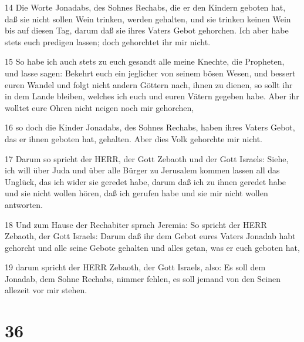 \par 14 Die Worte Jonadabs, des Sohnes Rechabs, die er den Kindern geboten hat, daß sie nicht sollen Wein trinken, werden gehalten, und sie trinken keinen Wein bis auf diesen Tag, darum daß sie ihres Vaters Gebot gehorchen. Ich aber habe stets euch predigen lassen; doch gehorchtet ihr mir nicht.
\par 15 So habe ich auch stets zu euch gesandt alle meine Knechte, die Propheten, und lasse sagen: Bekehrt euch ein jeglicher von seinem bösen Wesen, und bessert euren Wandel und folgt nicht andern Göttern nach, ihnen zu dienen, so sollt ihr in dem Lande bleiben, welches ich euch und euren Vätern gegeben habe. Aber ihr wolltet eure Ohren nicht neigen noch mir gehorchen,
\par 16 so doch die Kinder Jonadabs, des Sohnes Rechabs, haben ihres Vaters Gebot, das er ihnen geboten hat, gehalten. Aber dies Volk gehorchte mir nicht.
\par 17 Darum so spricht der HERR, der Gott Zebaoth und der Gott Israels: Siehe, ich will über Juda und über alle Bürger zu Jerusalem kommen lassen all das Unglück, das ich wider sie geredet habe, darum daß ich zu ihnen geredet habe und sie nicht wollen hören, daß ich gerufen habe und sie mir nicht wollen antworten.
\par 18 Und zum Hause der Rechabiter sprach Jeremia: So spricht der HERR Zebaoth, der Gott Israels: Darum daß ihr dem Gebot eures Vaters Jonadab habt gehorcht und alle seine Gebote gehalten und alles getan, was er euch geboten hat,
\par 19 darum spricht der HERR Zebaoth, der Gott Israels, also: Es soll dem Jonadab, dem Sohne Rechabs, nimmer fehlen, es soll jemand von den Seinen allezeit vor mir stehen.

\chapter{36}

